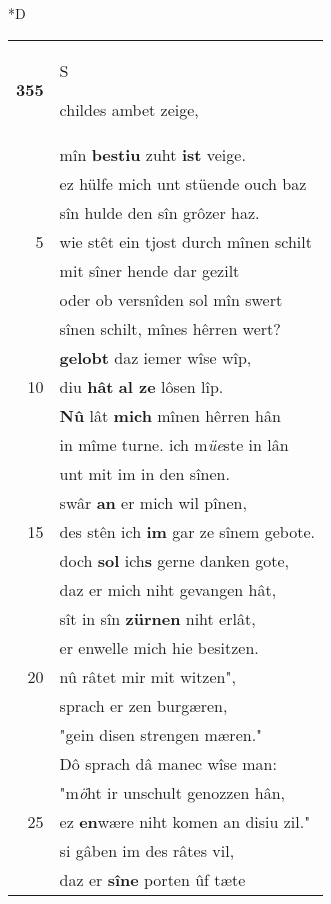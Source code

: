 \documentclass[8pt,a4paper,notitlepage]{article}
\begin{document}
\begin{table}[ht]
\begin{minipage}[t]{0.5\linewidth}
\small
\begin{center}*D
\end{center}
\begin{tabular}{rl}
\textbf{355} & \begin{large}S\end{large}childes ambet zeige,\\ 
 & mîn \textbf{bestiu} zuht \textbf{ist} veige.\\ 
 & ez hülfe mich unt stüende ouch baz\\ 
 & sîn hulde den sîn grôzer haz.\\ 
5 & wie stêt ein tjost durch mînen schilt\\ 
 & mit sîner hende dar gezilt\\ 
 & oder ob versnîden sol mîn swert\\ 
 & sînen schilt, mînes hêrren wert?\\ 
 & \textbf{gelobt} daz iemer wîse wîp,\\ 
10 & diu \textbf{hât} \textbf{al ze} lôsen lîp.\\ 
 & \textbf{Nû} lât \textbf{mich} mînen hêrren hân\\ 
 & in mîme turne. ich m\textit{üe}ste in lân\\ 
 & unt mit im in den sînen.\\ 
 & swâr \textbf{an} er mich wil pînen,\\ 
15 & des stên ich \textbf{im} gar ze sînem gebote.\\ 
 & doch \textbf{sol} ich\textbf{s} gerne danken gote,\\ 
 & daz er mich niht gevangen hât,\\ 
 & sît in sîn \textbf{zürnen} niht erlât,\\ 
 & er enwelle mich hie besitzen.\\ 
20 & nû râtet mir mit witzen",\\ 
 & sprach er zen burgæren,\\ 
 & "gein disen strengen mæren."\\ 
 & Dô sprach dâ manec wîse man:\\ 
 & "m\textit{ö}ht ir unschult genozzen hân,\\ 
25 & ez \textbf{en}wære niht komen an disiu zil."\\ 
 & si gâben im des râtes vil,\\ 
 & daz er \textbf{sîne} porten ûf tæte\\ 

\end{tabular}
\end{minipage}
\end{table}
\end{document}
